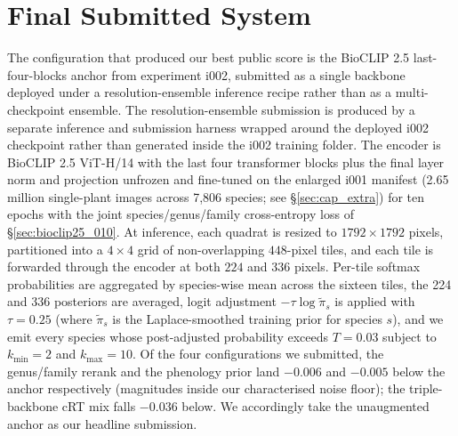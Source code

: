 \section{Final Submitted System}
\label{sec:final_submission}

The configuration that produced our best public score is the BioCLIP 2.5 last-four-blocks anchor from experiment i002, submitted as a single backbone deployed under a resolution-ensemble inference recipe rather than as a multi-checkpoint ensemble. The resolution-ensemble submission is produced by a separate inference and submission harness wrapped around the deployed i002 checkpoint rather than generated inside the i002 training folder. The encoder is BioCLIP 2.5 ViT-H/14 with the last four transformer blocks plus the final layer norm and projection unfrozen and fine-tuned on the enlarged i001 manifest (2.65 million single-plant images across 7,806 species; see \S\ref{sec:cap_extra}) for ten epochs with the joint species/genus/family cross-entropy loss of \S\ref{sec:bioclip25_010}. At inference, each quadrat is resized to $1792 \times 1792$ pixels, partitioned into a $4 \times 4$ grid of non-overlapping $448$-pixel tiles, and each tile is forwarded through the encoder at both $224$ and $336$ pixels. Per-tile softmax probabilities are aggregated by species-wise mean across the sixteen tiles, the 224 and 336 posteriors are averaged, logit adjustment $-\tau \log \tilde{\pi}_s$ is applied with $\tau{=}0.25$ (where $\tilde{\pi}_s$ is the Laplace-smoothed training prior for species $s$), and we emit every species whose post-adjusted probability exceeds $T{=}0.03$ subject to $k_{\min}{=}2$ and $k_{\max}{=}10$. Of the four configurations we submitted, the genus/family rerank and the phenology prior land $-0.006$ and $-0.005$ below the anchor respectively (magnitudes inside our characterised noise floor); the triple-backbone cRT mix falls $-0.036$ below. We accordingly take the unaugmented anchor as our headline submission.
